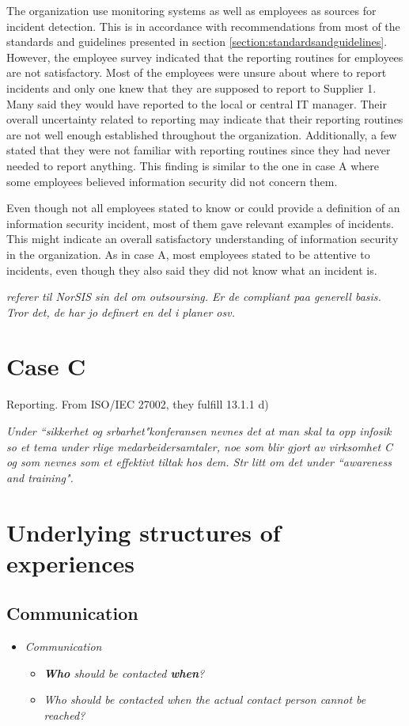 The organization use monitoring systems as well as employees as sources for incident detection. This is in accordance with recommendations from most of the standards and guidelines presented in section \ref{section:standardsandguidelines}. However, the employee survey indicated that the reporting routines for employees are not satisfactory. Most of the employees were unsure about where to report incidents and only one knew that they are supposed to report to Supplier 1. Many said they would have reported to the local or central IT manager. Their overall uncertainty related to reporting may indicate that their reporting routines are not well enough established throughout the organization. Additionally, a few stated that they were not familiar with reporting routines since they had never needed to report anything. This finding is similar to the one in case A where some employees believed information security did not concern them. 

Even though not all employees stated to know or could provide a definition of an information security incident, most of them gave relevant examples of incidents. This might indicate an overall satisfactory understanding of information security in the organization. As in case A, most employees stated to be attentive to incidents, even though they also said they did not know what an incident is. 



\textit{referer til NorSIS sin del om outsoursing. Er de compliant paa generell basis. Tror det, de har jo definert en del i planer osv.}

\section{Case C}

Reporting. From ISO/IEC 27002, they fulfill 13.1.1 d)

\textit{Under ``sikkerhet og srbarhet"konferansen nevnes det at man skal ta opp infosik so et tema under rlige medarbeidersamtaler, noe som blir gjort av virksomhet C og som nevnes som et effektivt tiltak hos dem. Str litt om det under ``awareness and training".}

\section{Underlying structures of experiences}
\subsection{Communication}
\begin{itemize}
\item \textit{Communication}
\begin{itemize}
\item \textit{\textbf{Who} should be contacted \textbf{when}?}
\item \textit{Who should be contacted when the actual contact person cannot be reached?}
\end{itemize}
\end{itemize}

